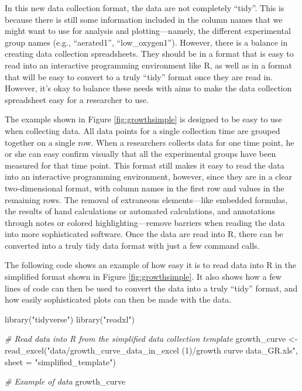 \documentclass[]{tufte-book}
\newenvironment{Shaded}{}{}
\newcommand{\AttributeTok}[1]{\textcolor[rgb]{0.49,0.56,0.16}{#1}}
\newcommand{\CommentTok}[1]{\textcolor[rgb]{0.38,0.63,0.69}{\textit{#1}}}
\newcommand{\FunctionTok}[1]{\textcolor[rgb]{0.02,0.16,0.49}{#1}}
\newcommand{\NormalTok}[1]{#1}
\newcommand{\OtherTok}[1]{\textcolor[rgb]{0.00,0.44,0.13}{#1}}
\newcommand{\StringTok}[1]{\textcolor[rgb]{0.25,0.44,0.63}{#1}}
\begin{document}
In this new data collection format, the data are not completely ``tidy''. This is because
there is still some information included in the column names that we might want to use
for analysis and plotting---namely, the different experimental group names (e.g.,
``aerated1'', ``low\_oxygen1''). However, there is a balance in creating data collection
spreadsheets. They should be in a format that is easy to read into an interactive
programming environment like R, as well as in a format that will be easy to convert
to a truly ``tidy'' format once they are read in. However, it's okay to balance these
needs with aims to make the data collection spreadsheet easy for a researcher to use.

The example shown in Figure \ref{fig:growthsimple} is designed to be easy to use
when collecting data. All data points for a single collection time are grouped together
on a single row. When a researchers collects data for one time point, he or she can
easy confirm visually that all the experimental groups have been measured for that
time point. This format still makes it easy to read the data into an interactive
programming environment, however, since they are in a clear two-dimensional format,
with column names in the first row and values in the remaining rows. The removal of
extraneous elements---like embedded formulas, the results of hand calculations or
automated calculations, and annotations through notes or colored highlighting---remove
barriers when reading the data into more sophisticated software. Once the data are
read into R, there can be converted into a truly tidy data format with just a few
command calls.

The following code shows an example of how easy it is to read data into R in the simplified
format shown in Figure \ref{fig:growthsimple}. It also shows how a few lines of code
can then be used to convert the data into a truly ``tidy'' format, and how easily
sophisticated plots can then be made with the data.

\begin{Shaded}
\begin{Highlighting}[]
\FunctionTok{library}\NormalTok{(}\StringTok{"tidyverse"}\NormalTok{)}
\FunctionTok{library}\NormalTok{(}\StringTok{"readxl"}\NormalTok{)}

\CommentTok{\# Read data into R from the simplified data collection template}
\NormalTok{growth\_curve }\OtherTok{\textless{}{-}} \FunctionTok{read\_excel}\NormalTok{(}\StringTok{"data/growth\_curve\_data\_in\_excel (1)/growth curve data\_GR.xls"}\NormalTok{, }
                           \AttributeTok{sheet =} \StringTok{"simplified\_template"}\NormalTok{)}

\CommentTok{\# Example of data}
\NormalTok{growth\_curve}
\end{Highlighting}
\end{Shaded}
\end{document}
